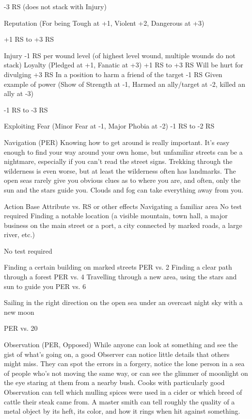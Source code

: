 \documentclass[oneside,11pt,english]{book}
\begin{document}
-3 RS (does not stack with Injury) 

Reputation (For being Tough at +1, Violent +2, 
Dangerous at +3) 

+1 RS to +3 RS 

Injury -1 RS per wound level (of highest level 
wound, multiple wounds do not stack) 
Loyalty (Pledged at +1, Fanatic at +3) +1 RS to +3 RS 
Will be hurt for divulging +3 RS 
In a position to harm a friend of the target -1 RS 
Given example of power (Show of Strength at -1, 
Harmed an ally/target at -2, killed an ally at -3) 

-1 RS to -3 RS 

Exploiting Fear (Minor Fear at -1, Major Phobia at -2) -1 RS to -2 RS 

 

 

Navigation (PER) 
Knowing how to get around is really important. It’s easy enough to find your way around your own 
home, but unfamiliar streets can be a nightmare, especially if you can’t read the street signs. Trekking 
through the wilderness is even worse, but at least the wilderness often has landmarks. The open seas 
rarely give you obvious clues as to where you are, and often, only the sun and the stars guide you. Clouds 
and fog can take everything away from you. 

 

Action Base Attribute vs. RS 
or other effects 
Navigating a familiar area No test required 
Finding a notable location (a visible mountain, town hall, a major business on 
the main street or a port, a city connected by marked roads, a large river, etc.) 

No test required 

Finding a certain building on marked streets PER vs. 2 
Finding a clear path through a forest PER vs. 4 
Travelling through a new area, using the stars and sun to guide you PER vs. 6 


Sailing in the right direction on the open sea under an overcast night sky with a 
new moon 

PER vs. 20 

 

 

Observation (PER, Opposed) 
While anyone can look at something and see the gist of what’s going on, a good Observer can notice little 
details that others might miss. They can spot the errors in a forgery, notice the lone person in a sea of 
people who’s not moving the same way, or can see the glimmer of moonlight on the eye staring at them 
from a nearby bush. Cooks with particularly good Observation can tell which mulling spices were used in 
a cider or which breed of cattle their steak came from. A master smith can tell roughly the quality of a 
metal object by its heft, its color, and how it rings when hit against something. 
\end{document}
